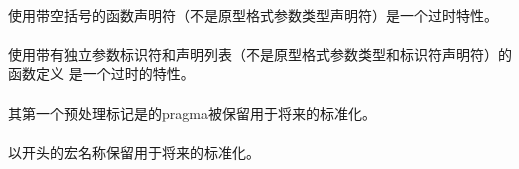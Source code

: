 \paragraph{}
使用带空括号的函数声明符（不是原型格式参数类型声明符）是一个过时特性。

\paragraph{}
使用带有独立参数标识符和声明列表（不是原型格式参数类型和标识符声明符）的函数定义
是一个过时的特性。

\paragraph{}
其第一个预处理标记是的pragma被保留用于将来的标准化。

\paragraph{}
以开头的宏名称保留用于将来的标准化。


